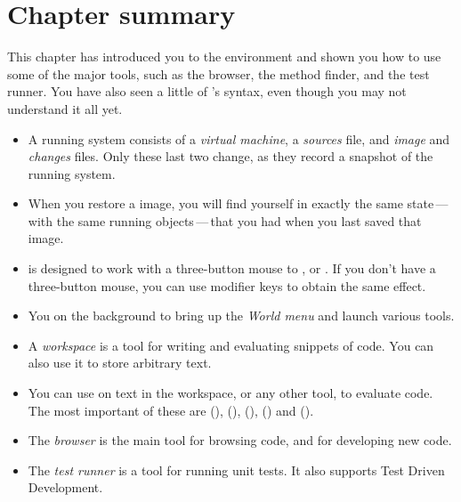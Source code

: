 \documentclass[a4paper,10pt,twoside]{book}
\begin{document}
\section{Chapter summary}
This chapter has introduced you to the \pharo environment and shown you how to use some of the major tools, such as the browser, the method finder, and the test runner.   You have also seen a little of \pharo's syntax, even though you may not understand it all yet.

\begin{itemize}
  \item A running \pharo system consists of a \emph{virtual machine}, a \emph{sources} file, and \emph{image} and \emph{changes} files. Only these last two change, as they record a snapshot of the running system.
  \item When you restore a \pharo image, you will find yourself in exactly the same state\,---\,with the same running objects\,---\,that you had when you last saved that image.
  \item \pharo is designed to work with a three-button mouse to \click, \actclick or \metaclick.  If you don't have a three-button mouse, you can use modifier keys to obtain the same effect.
  \item You \click on the \pharo background to bring up the \emph{World menu} and launch various tools.
  \item A \emph{workspace} is a tool for writing and evaluating snippets of code. You can also use it to store arbitrary text.
  \item You can use  on text in the workspace, or any other tool, to evaluate code. The most important of these are  (),  (),  (),  () and  ().
  \item The \emph{browser} is the main tool for browsing \pharo code, and for developing new code.
  \item The \emph{test runner} is a tool for running unit tests. It also supports Test Driven Development.
\end{itemize}

\ifx\wholebook\relax\else 
   
   
\end{document}
